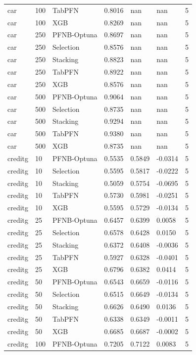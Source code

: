 \begin{tabular}{llllllr}
car & 100 & TabPFN & 0.8016 & nan & nan & 5 \\
car & 100 & XGB & 0.8269 & nan & nan & 5 \\
car & 250 & PFNB-Optuna & 0.8697 & nan & nan & 5 \\
car & 250 & Selection & 0.8576 & nan & nan & 5 \\
car & 250 & Stacking & 0.8823 & nan & nan & 5 \\
car & 250 & TabPFN & 0.8922 & nan & nan & 5 \\
car & 250 & XGB & 0.8576 & nan & nan & 5 \\
car & 500 & PFNB-Optuna & 0.9064 & nan & nan & 5 \\
car & 500 & Selection & 0.8735 & nan & nan & 5 \\
car & 500 & Stacking & 0.9294 & nan & nan & 5 \\
car & 500 & TabPFN & 0.9380 & nan & nan & 5 \\
car & 500 & XGB & 0.8735 & nan & nan & 5 \\
creditg & 10 & PFNB-Optuna & 0.5535 & 0.5849 & -0.0314 & 5 \\
creditg & 10 & Selection & 0.5595 & 0.5817 & -0.0222 & 5 \\
creditg & 10 & Stacking & 0.5059 & 0.5754 & -0.0695 & 5 \\
creditg & 10 & TabPFN & 0.5730 & 0.5981 & -0.0251 & 5 \\
creditg & 10 & XGB & 0.5595 & 0.5729 & -0.0134 & 5 \\
creditg & 25 & PFNB-Optuna & 0.6457 & 0.6399 & 0.0058 & 5 \\
creditg & 25 & Selection & 0.6578 & 0.6428 & 0.0150 & 5 \\
creditg & 25 & Stacking & 0.6372 & 0.6408 & -0.0036 & 5 \\
creditg & 25 & TabPFN & 0.5927 & 0.6328 & -0.0401 & 5 \\
creditg & 25 & XGB & 0.6796 & 0.6382 & 0.0414 & 5 \\
creditg & 50 & PFNB-Optuna & 0.6543 & 0.6659 & -0.0116 & 5 \\
creditg & 50 & Selection & 0.6515 & 0.6649 & -0.0134 & 5 \\
creditg & 50 & Stacking & 0.6626 & 0.6490 & 0.0136 & 5 \\
creditg & 50 & TabPFN & 0.6338 & 0.6349 & -0.0011 & 5 \\
creditg & 50 & XGB & 0.6685 & 0.6687 & -0.0002 & 5 \\
creditg & 100 & PFNB-Optuna & 0.7205 & 0.7122 & 0.0083 & 5 \\

\end{tabular}

